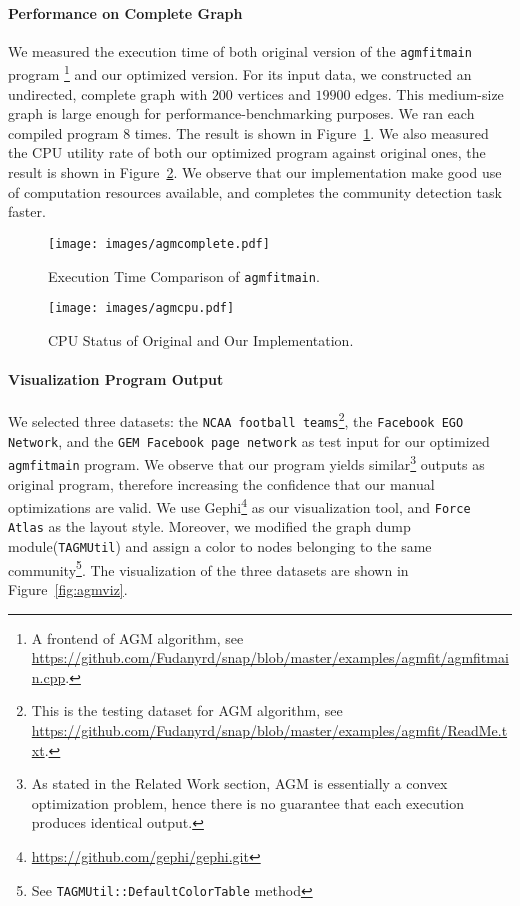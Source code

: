 \paragraph{Performance on Complete Graph} We measured the execution time of 
both original version of the \texttt{agmfitmain} program
\footnote{A frontend of AGM algorithm, see \url{https://github.com/Fudanyrd/snap/blob/master/examples/agmfit/agmfitmain.cpp}.}
 and our optimized version. For its input data, we constructed an undirected,
complete graph with $200$ vertices and $19900$ edges. This medium-size graph 
is large enough  for performance-benchmarking purposes.
We ran each compiled program $8$ times.
The result is shown in Figure~\ref{fig:agmcomplete}. We also measured the CPU utility 
rate of both our optimized program  against original ones, the result is 
shown in Figure~\ref{fig:agmcpu}. We observe that our implementation make
good use of computation resources available, and completes the 
community detection task faster.

\begin{figure*}[ht]
    \centering
    \begin{subfigure}[b]{0.45\textwidth}
        \texttt{[image: images/agmcomplete.pdf]}
        \caption{Execution Time Comparison of \texttt{agmfitmain}. }
        \label{fig:agmcomplete}
    \end{subfigure}
    \begin{subfigure}[b]{0.45\textwidth}
        \texttt{[image: images/agmcpu.pdf]}
        \caption{CPU Status of Original and Our Implementation.}
        \label{fig:agmcpu}
    \end{subfigure}
\end{figure*}

\paragraph{Visualization Program Output} We selected three datasets:
the \texttt{NCAA football teams}\footnote{This is the testing dataset 
for AGM algorithm, see \url{https://github.com/Fudanyrd/snap/blob/master/examples/agmfit/ReadMe.txt}. }, 
the \texttt{Facebook EGO Network}\citep{egonetwork}, 
and the \texttt{GEM Facebook page network}\citep{gemsec} as test input
for our optimized \texttt{agmfitmain} program. We observe that our program
yields similar\footnote{As stated in the Related Work section, AGM
is essentially a convex optimization problem, hence there is no guarantee
that each execution produces identical output. }
outputs as original program, therefore increasing 
the confidence that our manual optimizations are valid. 
We use Gephi\footnote{\url{https://github.com/gephi/gephi.git}} as 
our visualization tool, and \texttt{Force Atlas} as the layout style. Moreover,
we modified the graph dump module(\texttt{TAGMUtil}) and assign a color
to nodes belonging to the same community\footnote{See \texttt{TAGMUtil::DefaultColorTable}
method}.
The visualization of the three datasets are shown in Figure~\ref{fig:agmviz}. 

